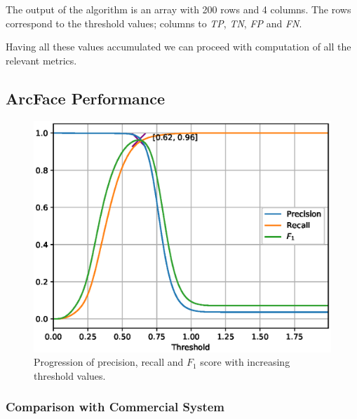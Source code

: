 The output of the algorithm is an array with 200 rows and 4 columns.
The rows correspond to the threshold values; columns to \textit{TP}, \textit{TN}, \textit{FP} and \textit{FN}.

Having all these values accumulated we can proceed with computation of all the relevant metrics.

\subsection{ArcFace Performance}\label{subsec:arcface-performance}

\begin{figure}[H]
\centering
\includegraphics[width=0.9\columnwidth]{images/implementation/prft_fav-128_N1.eps}
\caption{Progression of precision, recall and $F_1$ score with increasing threshold values.}
\label{fig:prft}
\end{figure}

\subsubsection{Comparison with Commercial System}\label{subsubsec:comparison-with-commercial-system}

